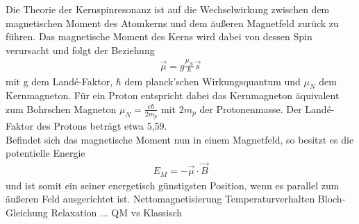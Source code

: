 \label{theorie}
Die Theorie der Kernspinresonanz ist auf die Wechselwirkung zwischen dem magnetischen Moment des Atomkerns und dem äußeren Magnetfeld zurück zu führen.
Das magnetische Moment des Kerns wird dabei von dessen Spin verursacht und folgt der Beziehung
\begin{align}
\vec{\mu}=g \frac{\mu_N}{\hbar}\vec{s}
\end{align}
mit g dem Landé-Faktor, $\hbar$ dem planck'schen Wirkungsquantum und $\mu_N$ dem Kernmagneton. Für ein Proton entspricht dabei das Kernmagneton äquivalent zum Bohrschen Magneton $\mu_N=\frac{e \hbar}{2m_p}$ mit $2m_p$ der Protonenmasse. Der Landé-Faktor des Protons beträgt etwa 5,59.\\
Befindet sich das magnetische Moment nun in einem Magnetfeld, so besitzt es die potentielle Energie 
\begin{align}
E_M=-\vec{\mu} \cdot \vec{B}
\end{align}
und ist somit ein seiner energetisch günstigsten Position, wenn es parallel zum äußeren Feld ausgerichtet ist.
Nettomagnetisierung
Temperaturverhalten
Bloch-Gleichung
Relaxation
...
QM vs Klassisch


